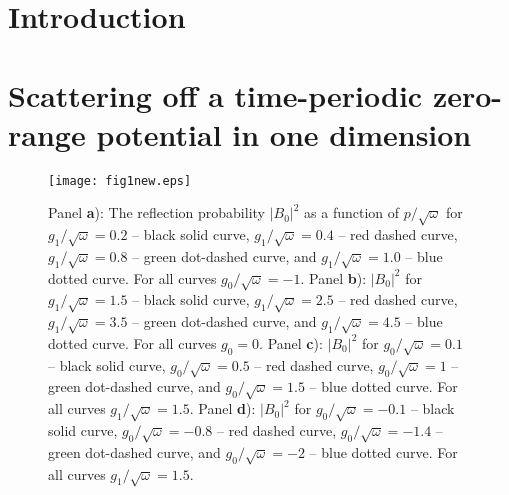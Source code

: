 \date{Received: date / Accepted: date}



\maketitle

\begin{abstract}
\end{abstract}



\section{Introduction}



\section{Scattering off a time-periodic zero-range potential in one dimension}
\label{sec:zero}
\begin{figure}
\centering
\texttt{[image: fig1new.eps]}
\caption{Panel {\textbf a)}: The reflection probability $|B_0|^2$ as a function of $p/\sqrt{\omega}$ for $g_1/\sqrt{\omega}=0.2$ -- black solid curve, $g_1/\sqrt{\omega}=0.4$ -- red dashed curve,  $g_1/\sqrt{\omega}=0.8$ -- green dot-dashed curve, and $g_1/\sqrt{\omega}=1.0$ -- blue dotted curve. For all curves $g_0/\sqrt{\omega}=-1$. Panel {\textbf b)}: $|B_0|^2$ for $g_1/\sqrt{\omega}=1.5$ -- black solid curve, $g_1/\sqrt{\omega}=2.5$ -- red dashed curve, $g_1/\sqrt{\omega}=3.5$ -- green dot-dashed curve, and $g_1/\sqrt{\omega}=4.5$ -- blue dotted curve. For all curves $g_0=0$. Panel {\textbf c)}: $|B_0|^2$ for $g_0/\sqrt{\omega}=0.1$ -- black solid curve, $g_0/\sqrt{\omega}=0.5$ -- red dashed curve,  $g_0/\sqrt{\omega}=1$ -- green dot-dashed curve, and $g_0/\sqrt{\omega}=1.5$ -- blue dotted curve. For all curves $g_1/\sqrt{\omega}=1.5$. Panel {\textbf d)}:  $|B_0|^2$ for $g_0/\sqrt{\omega}=-0.1$ -- black solid curve, $g_0/\sqrt{\omega}=-0.8$ -- red dashed curve,  $g_0/\sqrt{\omega}=-1.4$ -- green dot-dashed curve, and $g_0/\sqrt{\omega}=-2$ -- blue dotted curve. For all curves $g_1/\sqrt{\omega}=1.5$.}
\label{fig:fig1new}
\end{figure}







